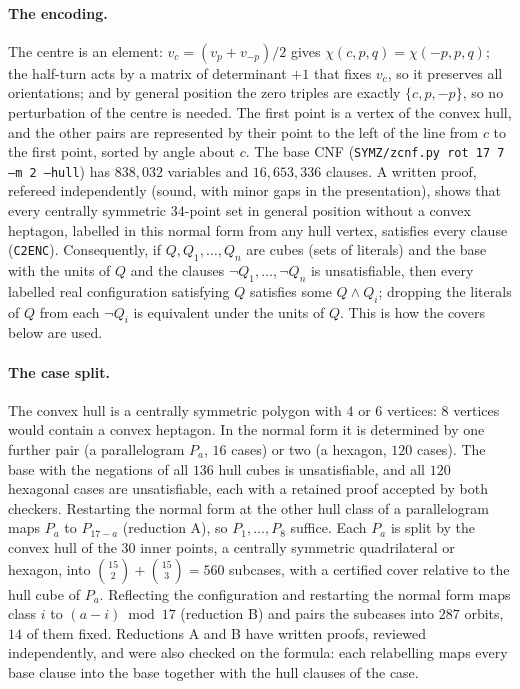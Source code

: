 \documentclass[11pt]{article}
\theoremstyle{remark}
\begin{document}
\paragraph{The encoding.} The centre is an element: $v_c=(v_p+v_{-p})/2$ gives $\chi(c,p,q)=\chi(-p,p,q)$; the half-turn
acts by a matrix of determinant $+1$ that fixes $v_c$, so it preserves all orientations; and by general position the zero
triples are exactly $\{c,p,-p\}$, so no perturbation of the centre is needed. The first point is a vertex of the convex
hull, and the other pairs are represented by their point to the left of the line from $c$ to the first point, sorted by
angle about $c$. The base CNF (\texttt{SYMZ/zcnf.py rot 17 7 --m 2 --hull}) has $838{,}032$ variables and
$16{,}653{,}336$ clauses. A written proof, refereed independently (sound, with minor gaps in the presentation), shows that
every centrally symmetric $34$-point set in general position without a convex heptagon, labelled in this normal form from
any hull vertex, satisfies every clause (\texttt{C2ENC}). Consequently, if $Q,Q_1,\dots,Q_n$ are cubes
(sets of literals) and the base with the units of $Q$ and the clauses $\neg Q_1,\dots,\neg Q_n$ is unsatisfiable, then
every labelled real configuration satisfying $Q$ satisfies some $Q\wedge Q_i$; dropping the literals of $Q$ from each
$\neg Q_i$ is equivalent under the units of $Q$. This is how the covers below are used.

\paragraph{The case split.} The convex hull is a centrally symmetric polygon with $4$ or $6$ vertices: $8$ vertices would
contain a convex heptagon. In the normal form it is determined by one further pair (a parallelogram $P_a$, $16$ cases) or
two (a hexagon, $120$ cases). The base with the negations of all $136$ hull cubes is unsatisfiable, and all $120$
hexagonal cases are unsatisfiable, each with a retained proof accepted by both checkers. Restarting the normal form at the
other hull class of a parallelogram maps $P_a$ to $P_{17-a}$ (reduction A), so $P_1,\dots,P_8$ suffice. Each $P_a$ is
split by the convex hull of the $30$ inner points, a centrally symmetric quadrilateral or hexagon, into
$\binom{15}{2}+\binom{15}{3}=560$ subcases, with a certified cover relative to the hull cube of $P_a$. Reflecting the
configuration and restarting the normal form maps class $i$ to $(a-i)\bmod 17$ (reduction B) and pairs the subcases into
$287$ orbits, $14$ of them fixed. Reductions A and B have written proofs, reviewed independently, and were also checked
on the formula: each relabelling maps every base clause into the base together with the hull clauses of the case.
\end{document}
